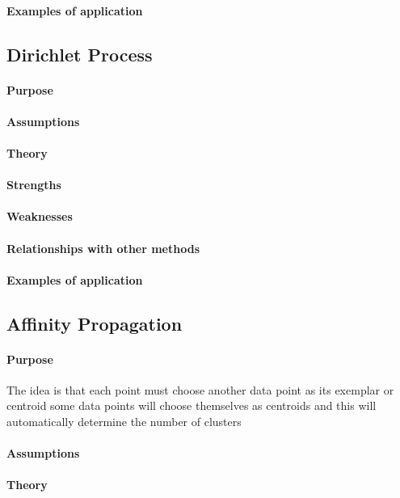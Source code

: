 \paragraph{Examples of application}

\subsection{Dirichlet Process}
\paragraph{Purpose}
\paragraph{Assumptions}
\paragraph{Theory}
\paragraph{Strengths}
\paragraph{Weaknesses}
\paragraph{Relationships with other methods}
\paragraph{Examples of application}

\subsection{Affinity Propagation}
\paragraph{Purpose}
The idea is that each point must choose another data point as its exemplar or centroid
some data points will choose themselves as centroids and this will automatically determine
the number of clusters 
\paragraph{Assumptions}
\paragraph{Theory}
